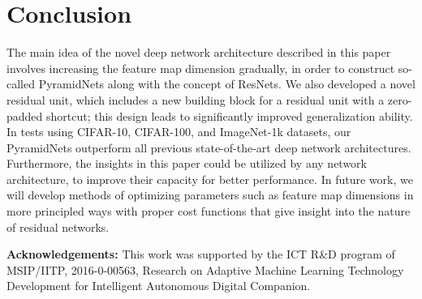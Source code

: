 \documentclass[10pt,twocolumn,letterpaper]{article}
\begin{document}
\section{Conclusion}
The main idea of the novel deep network architecture described in this paper involves increasing the feature map dimension gradually, in order to construct so-called PyramidNets along with the concept of ResNets. We also developed a novel residual unit, which includes a new building block for a residual unit with a zero-padded shortcut; this design leads to significantly improved generalization ability. In tests using CIFAR-10, CIFAR-100, and ImageNet-1k datasets, our PyramidNets outperform all previous state-of-the-art deep network architectures. Furthermore, the insights in this paper could be utilized by any network architecture, to improve their capacity for better performance. In future work, we will develop methods of optimizing parameters such as feature map dimensions in more principled ways with proper cost functions that give insight into the nature of residual networks.
\label{sec:conclusion}


{\noindent  \bf Acknowledgements:}
{
This work was supported by the ICT R\&D program of MSIP/IITP, 2016-0-00563, Research on Adaptive Machine Learning Technology Development for Intelligent Autonomous Digital Companion.
}

{\small


}
\end{document}

